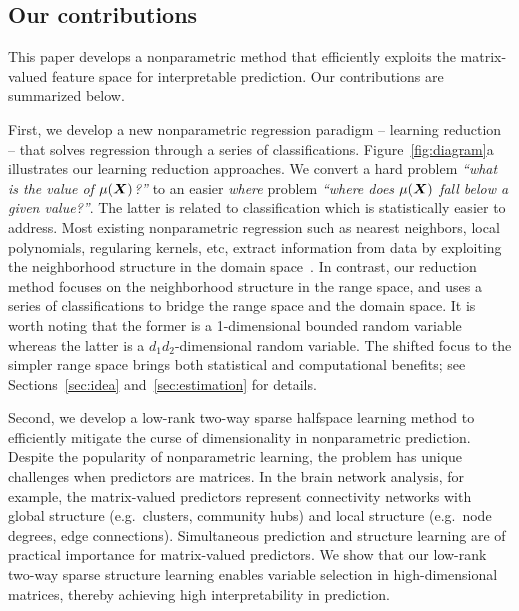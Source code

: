 \documentclass[11pt]{article}
\theoremstyle{plain}
\theoremstyle{definition}
\begin{document}

\subsection{Our contributions}
This paper develops a nonparametric method that efficiently exploits the matrix-valued feature space for interpretable prediction. Our contributions are summarized below. 

First, we develop a new nonparametric regression paradigm -- learning reduction~\citep{vapnik2013nature} -- that solves regression through a series of classifications. Figure~\ref{fig:diagram}a illustrates our learning reduction approaches. We convert a hard problem \emph{``what is the value of $\mu(\bm X)$?''} to an easier \emph{where} problem \emph{``where does $\mu(\bm X)$ fall below a given value?''}. The latter is related to classification which is statistically easier to address. Most existing nonparametric regression such as nearest neighbors, local polynomials, regularing kernels, etc, extract information from data by exploiting the neighborhood structure in the domain space~\citep{wasserman2006all}. In contrast, our reduction method focuses on the neighborhood structure in the range space, and uses a series of classifications to bridge the range space and the domain space. It is worth noting that the former is a 1-dimensional bounded random variable whereas the latter is a $d_1d_2$-dimensional random variable. The shifted focus to the simpler range space brings both statistical and computational benefits; see Sections~\ref{sec:idea} and~\ref{sec:estimation} for details. 

Second, we develop a low-rank two-way sparse halfspace learning method to efficiently mitigate the curse of dimensionality in nonparametric prediction. Despite the popularity of nonparametric learning, the problem has unique challenges when predictors are matrices. In the brain network analysis, for example, the matrix-valued predictors represent connectivity networks with global structure (e.g.\ clusters, community hubs) and local structure (e.g.\ node degrees, edge connections)\citep{relion2019network}. Simultaneous prediction and structure learning are of practical importance for matrix-valued predictors. We show that our low-rank two-way sparse structure learning enables variable selection in high-dimensional matrices, thereby achieving high interpretability in prediction. 
\end{document}
